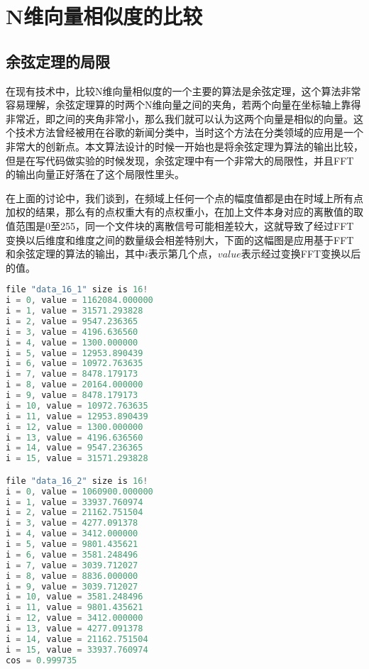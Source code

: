 \section{N维向量相似度的比较}
\label{sec:Nsimi}

\subsection{余弦定理的局限}

在现有技术中，比较N维向量相似度的一个主要的算法是余弦定理，这个算法非常容易理解，余弦定理算的时两个N维向量之间的夹角，若两个向量在坐标轴上靠得非常近，即之间的夹角非常小，那么我们就可以认为这两个向量是相似的向量。这个技术方法曾经被用在谷歌的新闻分类中，当时这个方法在分类领域的应用是一个非常大的创新点。本文算法设计的时候一开始也是将余弦定理为算法的输出比较，但是在写代码做实验的时候发现，余弦定理中有一个非常大的局限性，并且FFT的输出向量正好落在了这个局限性里头。

在上面的讨论中，我们谈到，在频域上任何一个点的幅度值都是由在时域上所有点加权的结果，那么有的点权重大有的点权重小，在加上文件本身对应的离散值的取值范围是0至255，同一个文件块的离散信号可能相差较大，这就导致了经过FFT变换以后维度和维度之间的数量级会相差特别大，下面的这幅图是应用基于FFT和余弦定理的算法的输出，其中$i$表示第几个点，$value$表示经过变换FFT变换以后的值。

\begin{lstlisting}[language={C}, caption={基于余弦定理检测相似度的结果}]
file "data_16_1" size is 16!
i = 0, value = 1162084.000000
i = 1, value = 31571.293828
i = 2, value = 9547.236365
i = 3, value = 4196.636560
i = 4, value = 1300.000000
i = 5, value = 12953.890439
i = 6, value = 10972.763635
i = 7, value = 8478.179173
i = 8, value = 20164.000000
i = 9, value = 8478.179173
i = 10, value = 10972.763635
i = 11, value = 12953.890439
i = 12, value = 1300.000000
i = 13, value = 4196.636560
i = 14, value = 9547.236365
i = 15, value = 31571.293828

file "data_16_2" size is 16!
i = 0, value = 1060900.000000
i = 1, value = 33937.760974
i = 2, value = 21162.751504
i = 3, value = 4277.091378
i = 4, value = 3412.000000
i = 5, value = 9801.435621
i = 6, value = 3581.248496
i = 7, value = 3039.712027
i = 8, value = 8836.000000
i = 9, value = 3039.712027
i = 10, value = 3581.248496
i = 11, value = 9801.435621
i = 12, value = 3412.000000
i = 13, value = 4277.091378
i = 14, value = 21162.751504
i = 15, value = 33937.760974
cos = 0.999735
\end{lstlisting}

